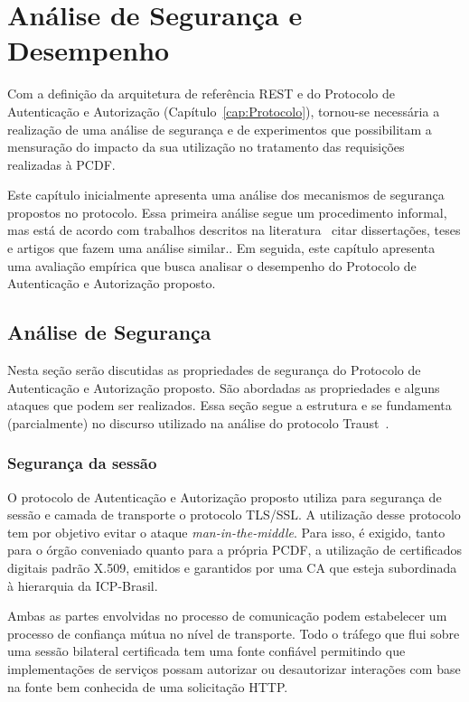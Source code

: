 \chapter{Análise de Segurança e Desempenho}

Com a definição da arquitetura de referência REST e do Protocolo de Autenticação e Autorização (Capítulo~\ref{cap:Protocolo}), tornou-se necessária a realização de uma análise de segurança e de experimentos que possibilitam a mensuração do impacto da sua utilização no tratamento das requisições realizadas à PCDF.

Este capítulo inicialmente apresenta uma análise dos mecanismos de segurança propostos no protocolo. Essa primeira
análise segue um procedimento informal, mas está de acordo com trabalhos descritos na literatura~\cite{} {\color{red}citar
disserta\c c\~{o}es, teses e artigos que fazem uma an\'{a}lise similar.}. Em seguida, este capítulo apresenta uma avaliação empírica que busca analisar o desempenho do Protocolo de Autenticação e Autorização proposto.

\section{Análise de Segurança}

Nesta seção serão discutidas as propriedades de segurança do Protocolo de Autenticação e Autorização proposto. São abordadas as propriedades e alguns ataques que podem ser realizados. Essa seção segue a estrutura e se fundamenta (parcialmente) no discurso utilizado na análise do protocolo Traust~\cite{traust08}.

\subsection{Segurança da sessão}

O protocolo de Autenticação e Autorização proposto utiliza para segurança de sessão e camada de transporte o protocolo TLS/SSL. A utilização desse protocolo tem por objetivo evitar o ataque \emph{man-in-the-middle}. Para isso, é exigido, tanto para o órgão conveniado quanto para a própria PCDF, a utilização de certificados digitais padrão X.509, emitidos e garantidos por uma CA que esteja subordinada à hierarquia da ICP-Brasil.

Ambas as partes envolvidas no processo de comunicação podem estabelecer um processo de confiança mútua no nível de transporte. Todo o tráfego que flui sobre uma sessão bilateral certificada tem uma fonte confiável permitindo que implementações de serviços possam autorizar ou desautorizar interações com base na fonte bem conhecida de uma solicitação HTTP.

